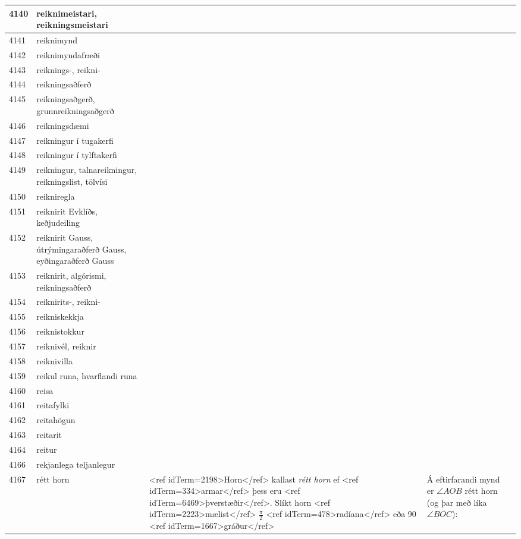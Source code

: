 \begin{longtable}{p{}|p{}|p{}|p{}|p{}}
\hline
4140 & reiknimeistari, reikningsmeistari &  &  &  \\
\hline
4141 & reiknimynd &  &  &  \\
\hline
4142 & reiknimyndafræði &  &  &  \\
\hline
4143 & reiknings-, reikni- &  &  &  \\
\hline
4144 & reikningsaðferð &  &  &  \\
\hline
4145 & reikningsaðgerð, grunnreikningsaðgerð &  &  &  \\
\hline
4146 & reikningsdæmi &  &  &  \\
\hline
4147 & reikningur í tugakerfi &  &  &  \\
\hline
4148 & reikningur í tylftakerfi &  &  &  \\
\hline
4149 & reikningur, talnareikningur, reikningslist, tölvísi &  &  &  \\
\hline
4150 & reikniregla &  &  & \\
\hline
4151 & reiknirit Evklíðs, keðjudeiling &  &  &  \\
\hline
4152 & reiknirit Gauss, útrýmingaraðferð Gauss, eyðingaraðferð Gauss &  &  &  \\
\hline
4153 & reiknirit, algórismi, reikningsaðferð &  &  &  \\
\hline
4154 & reiknirits-, reikni- &  &  &  \\
\hline
4155 & reikniskekkja &  &  &  \\
\hline
4156 & reiknistokkur &  &  &  \\
\hline
4157 & reiknivél, reiknir &  &  &  \\
\hline
4158 & reiknivilla &  &  &  \\
\hline
4159 & reikul runa, hvarflandi runa &  &  &  \\
\hline
4160 & reisa &  &  &  \\
\hline
4161 & reitafylki &  &  &  \\
\hline
4162 & reitahögun &  &  &  \\
\hline
4163 & reitarit &  &  &  \\
\hline
4164 & reitur &  &  &  \\
\hline
4166 & rekjanlega teljanlegur &  &  &  \\
\hline
4167 & rétt horn & <ref idTerm=2198>Horn</ref> kallast \textit{rétt horn} ef <ref idTerm=334>armar</ref> þess eru <ref idTerm=6469>þverstæðir</ref>. Slíkt horn <ref idTerm=2223>mælist</ref> $\frac{\pi}{2}$ <ref idTerm=478>radíana</ref> eða 90 <ref idTerm=1667>gráður</ref> & Á eftirfarandi mynd er $\angle AOB$ rétt horn (og þar með líka $\angle BOC$):


\end{longtable}
